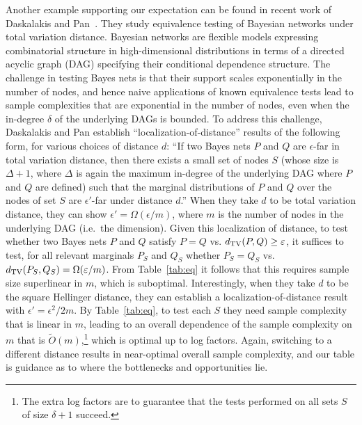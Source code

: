 Another example supporting our expectation can be found in recent work of Daskalakis and Pan~\cite{DaskalakisP17}. They study equivalence testing of Bayesian networks under total variation distance. Bayesian networks are flexible models expressing combinatorial structure in high-dimensional distributions in terms of a directed acyclic graph (DAG) specifying their conditional dependence structure. The challenge in testing Bayes nets is that their support scales exponentially in the number of nodes, and hence naive applications of known equivalence tests lead to sample complexities that are exponential in the number of nodes, even when the in-degree $\delta$ of the underlying DAGs is bounded. To address this challenge, Daskalakis and Pan establish ``localization-of-distance'' results of the following form, for various choices of distance $d$: ``If two Bayes nets $P$ and $Q$ are $\epsilon$-far in total variation distance, then there exists a small set of nodes $S$ (whose size is $\Delta+1$, where $\Delta$ is again the maximum in-degree of the underlying DAG where $P$ and $Q$ are defined) such that the marginal distributions of $P$ and $Q$ over the nodes of set $S$ are $\epsilon'$-far under distance $d$.'' When they take $d$ to be total variation distance, they can show $\epsilon'=\Omega(\epsilon/m)$, where $m$ is the number of nodes in the underlying DAG (i.e.~the dimension). Given this localization of distance, to test whether two Bayes nets $P$ and $Q$ satisfy $P=Q$ vs. $d_{\rm TV}(P,Q) \ge \epsilon$, it suffices to test, for all relevant marginals $P_S$ and $Q_S$ whether $P_S=Q_S$ vs. $d_{\rm TV}(P_S,Q_S)=\Omega(\epsilon/m)$. From Table~\ref{tab:eq} it follows that this requires sample size superlinear in $m$, which is suboptimal. Interestingly, when they take $d$ to be the square Hellinger distance, they can establish a localization-of-distance result with $\epsilon'=\epsilon^2/2m$. By Table~\ref{tab:eq}, to test each $S$ they need sample complexity that is linear in $m$, leading to an overall dependence of the sample complexity on $m$ that is $\tilde{O}(m)$,\footnote{The extra log factors are to guarantee that the tests performed on all sets $S$ of size $\delta+1$ succeed.} which is optimal up to log factors. Again, switching to a different distance results in near-optimal overall sample complexity, and our table is guidance as to where the bottlenecks and opportunities lie. 


